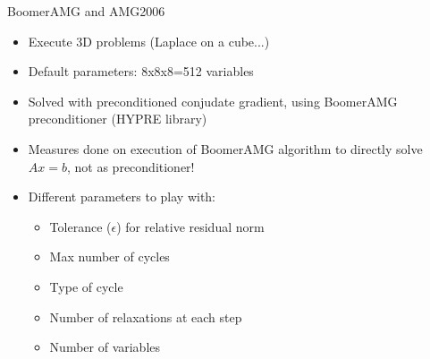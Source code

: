 \documentclass{beamer}
\begin{document}
\begin{frame}{BoomerAMG and AMG2006}
  
  \begin{itemize}
   \item Execute 3D problems (Laplace on a cube...)
   \item Default parameters: 8x8x8=512 variables
   \item Solved with preconditioned conjudate gradient, using BoomerAMG preconditioner (HYPRE library)
   \pause
   \item Measures done on execution of BoomerAMG algorithm to directly solve $Ax=b$, not as preconditioner!
   \item Different parameters to play with:
    \begin{itemize}
      \item Tolerance ($\epsilon$) for relative residual norm
      \item Max number of cycles
      \item Type of cycle
      \item Number of relaxations at each step
      \item Number of variables
    \end{itemize}
    
  \end{itemize}
 
\end{frame}
\end{document}
